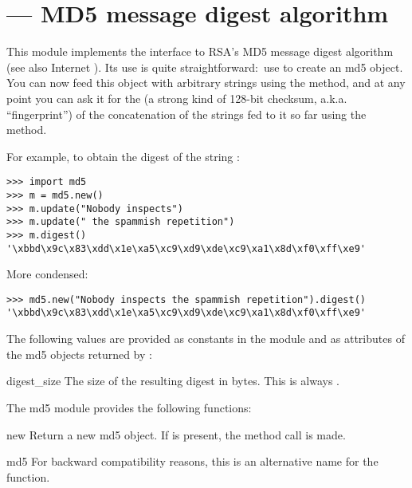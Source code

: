 \section{ ---
         MD5 message digest algorithm}



This module implements the interface to RSA's MD5 message digest
algorithm (see also Internet ).  Its use is quite
straightforward:\ use  to create an md5 object.
You can now feed this object with arbitrary strings using the
 method, and at any point you can ask it for the
 (a strong kind of 128-bit checksum,
a.k.a. ``fingerprint'') of the concatenation of the strings fed to it
so far using the  method.

For example, to obtain the digest of the string :

\begin{verbatim}
>>> import md5
>>> m = md5.new()
>>> m.update("Nobody inspects")
>>> m.update(" the spammish repetition")
>>> m.digest()
'\xbbd\x9c\x83\xdd\x1e\xa5\xc9\xd9\xde\xc9\xa1\x8d\xf0\xff\xe9'
\end{verbatim}

More condensed:

\begin{verbatim}
>>> md5.new("Nobody inspects the spammish repetition").digest()
'\xbbd\x9c\x83\xdd\x1e\xa5\xc9\xd9\xde\xc9\xa1\x8d\xf0\xff\xe9'
\end{verbatim}

The following values are provided as constants in the module and as
attributes of the md5 objects returned by :

\begin{datadesc}{digest_size}
  The size of the resulting digest in bytes.  This is always
  .
\end{datadesc}

The md5 module provides the following functions:

\begin{funcdesc}{new}{}
Return a new md5 object.  If  is present, the method call
 is made.
\end{funcdesc}

\begin{funcdesc}{md5}{}
For backward compatibility reasons, this is an alternative name for the
 function.
\end{funcdesc}

